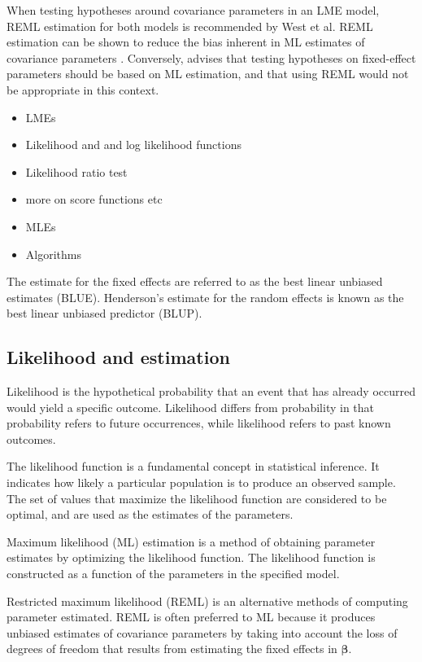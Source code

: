\documentclass[12pt, a4paper]{report}
\begin{document}
When testing hypotheses around covariance parameters in an LME model, REML estimation for both models is recommended by West et al. REML estimation can be shown to reduce the bias inherent in ML estimates of covariance parameters \citep{west}. Conversely, \citet{pb} advises that testing hypotheses on fixed-effect parameters should be based on ML estimation, and that using REML would not be appropriate in this context.



\begin{itemize}
\item LMEs
\item Likelihood and and log likelihood functions
\item Likelihood ratio test
\item more on score functions etc
\item MLEs
\item Algorithms

\end{itemize}

The estimate for the fixed effects are referred to as the best linear unbiased estimates (BLUE). Henderson's estimate for the random effects is known as the best linear unbiased predictor (BLUP).

\subsection*{Likelihood and estimation}

Likelihood is the hypothetical probability that an event that has
already occurred would yield a specific outcome. Likelihood
differs from probability in that probability refers to future
occurrences, while likelihood refers to past known outcomes.

The likelihood function is a fundamental concept in statistical
inference. It indicates how likely a particular population is to
produce an observed sample. The set of values that maximize the
likelihood function are considered to be optimal, and are used as
the estimates of the parameters.

Maximum likelihood (ML) estimation is a method of obtaining
parameter estimates by optimizing the likelihood function. The
likelihood function is constructed as a function of the parameters
in the specified model.

Restricted maximum likelihood (REML) is an alternative methods of
computing parameter estimated. REML is often preferred to ML
because it produces unbiased estimates of covariance parameters by
taking into account the loss of degrees of freedom that results
from estimating the fixed effects in $\boldsymbol{\beta}$.
\end{document}
